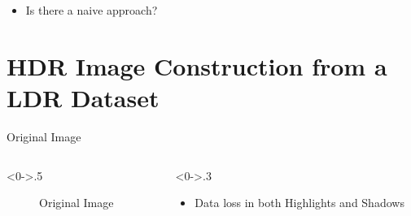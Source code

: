 \documentclass{beamer}
\begin{document}
		    \begin{frame}
		    \begin{itemize}
		        \item
		        Is there a naive approach?
		    \end{itemize}
		        
		    \end{frame}
	
	\section{HDR Image Construction from a LDR Dataset}
	
	\begin{frame}{Original Image}
 
		\begin{columns}[T]
			\begin{column}<0->{.5\textwidth}
				\begin{figure}[thpb]
					\centering
					\caption{Original Image}
					\label{fig:1}
				\end{figure}
			\end{column}%
			\hfill%
			\begin{column}<0->{.3\textwidth}
				\centering
			    \begin{itemize} 
			    \item Data loss in both Highlights and Shadows
			    \end{itemize}
		   
			\end{column}
		\end{columns}
	\end{frame}
	
\end{document}

